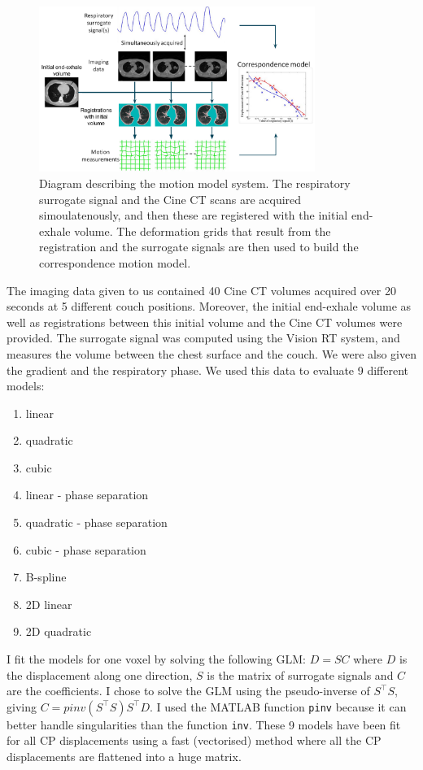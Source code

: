 \documentclass[11pt,a4paper,oneside]{report}
\begin{document}
\begin{figure}[H]
  \centering
 \includegraphics[width=0.8\textwidth]{figures/system_diagram.png}
 \caption{Diagram describing the motion model system. The respiratory surrogate signal and the Cine CT scans are acquired simoulatenously, and then these are registered with the initial end-exhale volume. The deformation grids that result from the registration and the surrogate signals are then used to build the correspondence motion model.}
\end{figure}

The imaging data given to us contained 40 Cine CT volumes acquired over 20 seconds at 5 different couch positions. Moreover, the initial end-exhale volume as well as registrations between this initial volume and the Cine CT volumes were provided. The surrogate signal was computed using the Vision RT system, and measures the volume between the chest surface and the couch. We were also given the gradient and the respiratory phase. We used this data to evaluate 9 different models:
\begin{multicols}{3}
\begin{enumerate}
 \item linear
 \item quadratic
 \item cubic
 \item linear - phase separation
 \item quadratic - phase separation
 \item cubic - phase separation
 \item B-spline
 \item 2D linear
 \item 2D quadratic
\end{enumerate}
\end{multicols}

I fit the models for one voxel by solving the following GLM: $D = SC$ where $D$ is the displacement along one direction, $S$ is the matrix of surrogate signals and $C$ are the coefficients. I chose to solve the GLM using the pseudo-inverse of $S^\top S$, giving $C = pinv(S^\top S)S^\top D$. I used the MATLAB function \texttt{pinv} because it can better handle singularities than the function \texttt{inv}. These 9 models have been fit for all CP displacements using a fast (vectorised) method where all the CP displacements are flattened into a huge matrix. 
\end{document}
